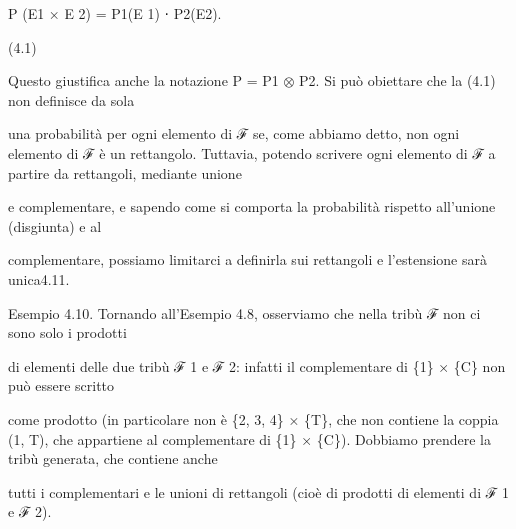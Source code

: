 \documentclass[a4paper,portrait,12pt]{article}
\begin{document}
\begin{flushleft}
P (E1 × E 2) = P1(E 1) ⋅ P2(E2).
\end{flushleft}





(4.1)





\begin{flushleft}
Questo giustifica anche la notazione P = P1 $\otimes$ P2. Si pu\`{o} obiettare che la (4.1) non definisce da sola
\end{flushleft}


\begin{flushleft}
una probabilit\`{a} per ogni elemento di ℱ se, come abbiamo detto, non ogni elemento di ℱ \`{e} un rettangolo. Tuttavia, potendo scrivere ogni elemento di ℱ a partire da rettangoli, mediante unione
\end{flushleft}


\begin{flushleft}
e complementare, e sapendo come si comporta la probabilit\`{a} rispetto all'unione (disgiunta) e al
\end{flushleft}


\begin{flushleft}
complementare, possiamo limitarci a definirla sui rettangoli e l'estensione sar\`{a} unica4.11.
\end{flushleft}


\begin{flushleft}
Esempio 4.10. Tornando all'Esempio 4.8, osserviamo che nella tribù ℱ non ci sono solo i prodotti
\end{flushleft}


\begin{flushleft}
di elementi delle due tribù ℱ 1 e ℱ 2: infatti il complementare di \{1\} × \{C\} non pu\`{o} essere scritto
\end{flushleft}


\begin{flushleft}
come prodotto (in particolare non \`{e} \{2, 3, 4\} × \{T\}, che non contiene la coppia (1, T), che appartiene al complementare di \{1\} × \{C\}). Dobbiamo prendere la tribù generata, che contiene anche
\end{flushleft}


\begin{flushleft}
tutti i complementari e le unioni di rettangoli (cio\`{e} di prodotti di elementi di ℱ 1 e ℱ 2).
\end{flushleft}
\end{document}
